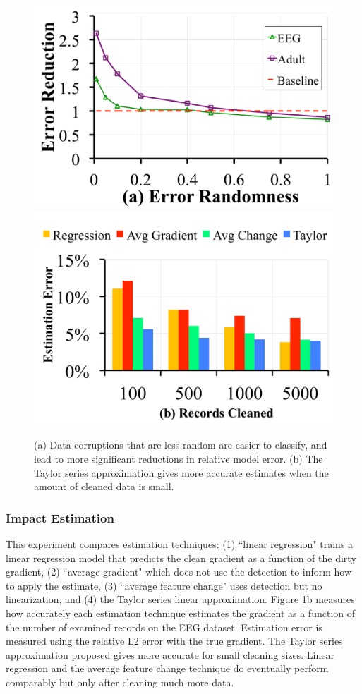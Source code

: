 \begin{figure}[ht!]
\centering
 \includegraphics[width=0.49\columnwidth]{exp/exp5a.pdf}
 \includegraphics[width=0.49\columnwidth]{exp/exp12.pdf}\vspace{-0.5em}
 \caption{(a) Data corruptions that are less random are easier to classify, and lead to more significant reductions in relative model error. (b) The Taylor series approximation gives more accurate estimates when the amount of cleaned data is small. \label{tradeoffs2}}
\end{figure}

\subsubsection{Impact Estimation}\label{est}
This experiment compares estimation techniques: (1) ``linear regression" trains a linear regression model that predicts the clean gradient as a function of the dirty gradient, (2) ``average gradient" which does not use the detection to inform how to apply the estimate, (3) ``average feature change" uses detection but no linearization, and (4) the Taylor series linear approximation.
Figure \ref{tradeoffs2}b measures how accurately each estimation technique estimates the gradient as a function of the number of examined records on the EEG dataset.
Estimation error is measured using the relative L2 error with the true gradient.
The Taylor series approximation proposed gives more accurate for small cleaning sizes.
Linear regression and the average feature change technique do eventually perform comparably but only after cleaning much more data.

